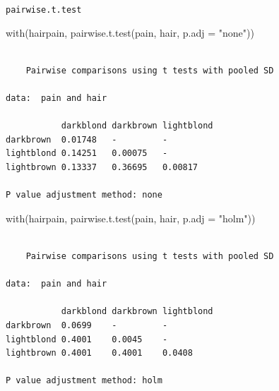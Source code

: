 \documentclass[
  ignorenonframetext,
]{beamer}
\newenvironment{Shaded}{\begin{snugshade}}{\end{snugshade}}
\newcommand{\AttributeTok}[1]{\textcolor[rgb]{0.40,0.45,0.13}{#1}}
\newcommand{\FunctionTok}[1]{\textcolor[rgb]{0.28,0.35,0.67}{#1}}
\newcommand{\NormalTok}[1]{\textcolor[rgb]{0.00,0.23,0.31}{#1}}
\newcommand{\StringTok}[1]{\textcolor[rgb]{0.13,0.47,0.30}{#1}}
\begin{document}
\begin{frame}[fragile]{\texttt{pairwise.t.test}}
\protect\hypertarget{pairwise.t.test}{}
\tiny

\begin{Shaded}
\begin{Highlighting}[]
\FunctionTok{with}\NormalTok{(hairpain, }\FunctionTok{pairwise.t.test}\NormalTok{(pain, hair, }\AttributeTok{p.adj =} \StringTok{"none"}\NormalTok{))}
\end{Highlighting}
\end{Shaded}

\begin{verbatim}

    Pairwise comparisons using t tests with pooled SD 

data:  pain and hair 

           darkblond darkbrown lightblond
darkbrown  0.01748   -         -         
lightblond 0.14251   0.00075   -         
lightbrown 0.13337   0.36695   0.00817   

P value adjustment method: none 
\end{verbatim}

\begin{Shaded}
\begin{Highlighting}[]
\FunctionTok{with}\NormalTok{(hairpain, }\FunctionTok{pairwise.t.test}\NormalTok{(pain, hair, }\AttributeTok{p.adj =} \StringTok{"holm"}\NormalTok{))}
\end{Highlighting}
\end{Shaded}

\begin{verbatim}

    Pairwise comparisons using t tests with pooled SD 

data:  pain and hair 

           darkblond darkbrown lightblond
darkbrown  0.0699    -         -         
lightblond 0.4001    0.0045    -         
lightbrown 0.4001    0.4001    0.0408    

P value adjustment method: holm 
\end{verbatim}

\normalsize
\end{frame}
\end{document}
